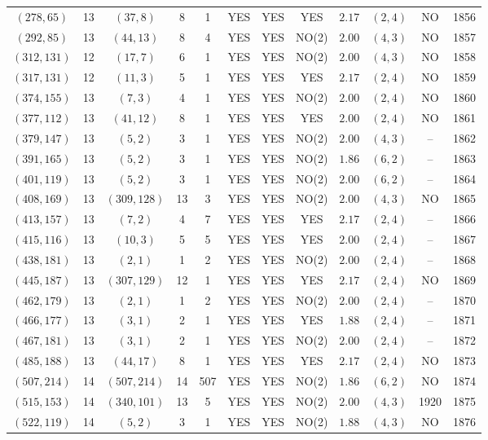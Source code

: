 \begin{longtable}{|c|c|c|c|c|c|c|c|c|c|c|c|}
$(278,65)$ & 13 & $(37,8)$ & 8 & 1 & YES & YES & YES & $2.17$ & $(2,4)$ & NO & 1856\\
$(292,85)$ & 13 & $(44,13)$ & 8 & 4 & YES & YES & NO(2) & $2.00$ & $(4,3)$ & NO & 1857\\
$(312,131)$ & 12 & $(17,7)$ & 6 & 1 & YES & YES & NO(2) & $2.00$ & $(4,3)$ & NO & 1858\\
$(317,131)$ & 12 & $(11,3)$ & 5 & 1 & YES & YES & YES & $2.17$ & $(2,4)$ & NO & 1859\\
$(374,155)$ & 13 & $(7,3)$ & 4 & 1 & YES & YES & NO(2) & $2.00$ & $(2,4)$ & NO & 1860\\
$(377,112)$ & 13 & $(41,12)$ & 8 & 1 & YES & YES & YES & $2.00$ & $(2,4)$ & NO & 1861\\
$(379,147)$ & 13 & $(5,2)$ & 3 & 1 & YES & YES & NO(2) & $2.00$ & $(4,3)$ & -- & 1862\\
$(391,165)$ & 13 & $(5,2)$ & 3 & 1 & YES & YES & NO(2) & $1.86$ & $(6,2)$ & -- & 1863\\
$(401,119)$ & 13 & $(5,2)$ & 3 & 1 & YES & YES & NO(2) & $2.00$ & $(6,2)$ & -- & 1864\\
$(408,169)$ & 13 & $(309,128)$ & 13 & 3 & YES & YES & NO(2) & $2.00$ & $(4,3)$ & NO & 1865\\
$(413,157)$ & 13 & $(7,2)$ & 4 & 7 & YES & YES & YES & $2.17$ & $(2,4)$ & -- & 1866\\
$(415,116)$ & 13 & $(10,3)$ & 5 & 5 & YES & YES & YES & $2.00$ & $(2,4)$ & -- & 1867\\
$(438,181)$ & 13 & $(2,1)$ & 1 & 2 & YES & YES & NO(2) & $2.00$ & $(2,4)$ & -- & 1868\\
$(445,187)$ & 13 & $(307,129)$ & 12 & 1 & YES & YES & YES & $2.17$ & $(2,4)$ & NO & 1869\\
$(462,179)$ & 13 & $(2,1)$ & 1 & 2 & YES & YES & NO(2) & $2.00$ & $(2,4)$ & -- & 1870\\
$(466,177)$ & 13 & $(3,1)$ & 2 & 1 & YES & YES & YES & $1.88$ & $(2,4)$ & -- & 1871\\
$(467,181)$ & 13 & $(3,1)$ & 2 & 1 & YES & YES & NO(2) & $2.00$ & $(2,4)$ & -- & 1872\\
$(485,188)$ & 13 & $(44,17)$ & 8 & 1 & YES & YES & YES & $2.17$ & $(2,4)$ & NO & 1873\\
$(507,214)$ & 14 & $(507,214)$ & 14 & 507 & YES & YES & NO(2) & $1.86$ & $(6,2)$ & NO & 1874\\
$(515,153)$ & 14 & $(340,101)$ & 13 & 5 & YES & YES & NO(2) & $2.00$ & $(4,3)$ & 1920 & 1875\\
$(522,119)$ & 14 & $(5,2)$ & 3 & 1 & YES & YES & NO(2) & $1.88$ & $(4,3)$ & NO & 1876\\

\end{longtable}
